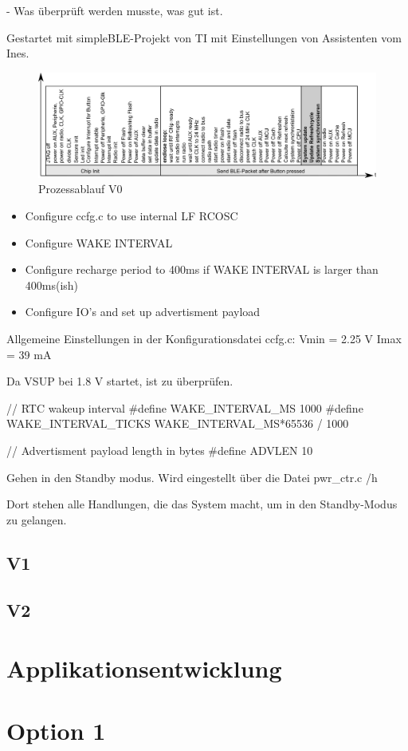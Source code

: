 - Was überprüft werden musste, was gut ist.

Gestartet mit simpleBLE-Projekt von TI mit Einstellungen von Assistenten vom Ines.

\begin{figure}
  \includegraphics[width=1.0\textwidth]{../ressources/SimpleLink/V0Sendeablauf.png}
  \caption{Prozessablauf V0}
\end{figure}




\begin{itemize}
    \item Configure ccfg.c to use internal LF RCOSC
    \item Configure WAKE INTERVAL
    \item Configure recharge period to 400ms if WAKE INTERVAL is larger than 400ms(ish)
    \item Configure IO's and set up advertisment payload       
\end{itemize}

Allgemeine Einstellungen in der Konfigurationsdatei ccfg.c:
Vmin = 2.25 V
Imax = 39 mA


Da VSUP bei 1.8 V startet, ist zu überprüfen. 


// RTC wakeup interval
\#define WAKE\_INTERVAL\_MS 		1000
\#define WAKE\_INTERVAL\_TICKS 	WAKE\_INTERVAL\_MS*65536 / 1000


// Advertisment payload length in bytes
\#define ADVLEN 10


Gehen in den Standby modus. Wird eingestellt über die Datei pwr\_ctr.c /h

Dort stehen alle Handlungen, die das System macht, um in den Standby-Modus zu gelangen.

\subsection{V1}


\subsection{V2}

\section{Applikationsentwicklung}


\section{Option 1}






